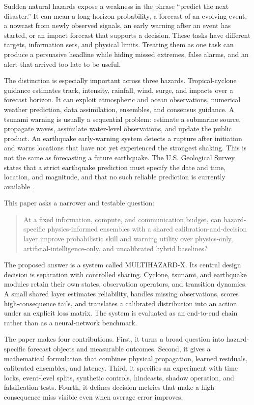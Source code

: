 \documentclass[conference]{IEEEtran}
\begin{document}
Sudden natural hazards expose a weakness in the phrase ``predict the next disaster.'' It can mean a long-horizon probability, a forecast of an evolving event, a nowcast from newly observed signals, an early warning after an event has started, or an impact forecast that supports a decision. These tasks have different targets, information sets, and physical limits. Treating them as one task can produce a persuasive headline while hiding missed extremes, false alarms, and an alert that arrived too late to be useful.

The distinction is especially important across three hazards. Tropical-cyclone guidance estimates track, intensity, rainfall, wind, surge, and impacts over a forecast horizon. It can exploit atmospheric and ocean observations, numerical weather prediction, data assimilation, ensembles, and consensus guidance. A tsunami warning is usually a sequential problem: estimate a submarine source, propagate waves, assimilate water-level observations, and update the public product. An earthquake early-warning system detects a rupture after initiation and warns locations that have not yet experienced the strongest shaking. This is not the same as forecasting a future earthquake. The U.S. Geological Survey states that a strict earthquake prediction must specify the date and time, location, and magnitude, and that no such reliable prediction is currently available \cite{usgs}.

This paper asks a narrower and testable question:

\begin{quote}
At a fixed information, compute, and communication budget, can hazard-specific physics-informed ensembles with a shared calibration-and-decision layer improve probabilistic skill and warning utility over physics-only, artificial-intelligence-only, and uncalibrated hybrid baselines?
\end{quote}

The proposed answer is a system called MULTIHAZARD-X. Its central design decision is separation with controlled sharing. Cyclone, tsunami, and earthquake modules retain their own states, observation operators, and transition dynamics. A small shared layer estimates reliability, handles missing observations, scores high-consequence tails, and translates a calibrated distribution into an action under an explicit loss matrix. The system is evaluated as an end-to-end chain rather than as a neural-network benchmark.

The paper makes four contributions. First, it turns a broad question into hazard-specific forecast objects and measurable outcomes. Second, it gives a mathematical formulation that combines physical propagation, learned residuals, calibrated ensembles, and latency. Third, it specifies an experiment with time locks, event-level splits, synthetic controls, hindcasts, shadow operation, and falsification tests. Fourth, it defines decision metrics that make a high-consequence miss visible even when average error improves.
\end{document}
